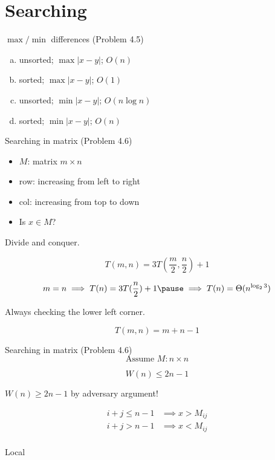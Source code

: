 \section{Searching}

\begin{frame}{$\max/\min$ differences (Problem 4.5)}
  \begin{enumerate}[(a)]
	\item unsorted; $\max |x - y|$; $O(n)$
	\item sorted; $\max |x - y|$; $O(1)$
	\item unsorted; $\min |x - y|$; $O(n \log n)$
	\item sorted; $\min |x - y|$; $O(n)$
  \end{enumerate}
\end{frame}
\begin{frame}{Searching in matrix (Problem 4.6)}
  \begin{itemize}
	\item $M$: matrix $m \times n$
	\item row: increasing from left to right
	\item col: increasing from top to down
	\item Is $x \in M$?
  \end{itemize}

  \pause
  \centerline{Divide and conquer.}

  \pause
  \[
	T(m,n) = 3T(\frac{m}{2}, \frac{n}{2}) + 1 
  \]

  \pause
  \[
	m = n \implies T(n) = 3T(\frac{n}{2}) + 1 \pause \implies T(n) = \Theta(n^{\log_{2}3})
  \]

  \pause
  \centerline{Always checking the lower left corner.}

  \pause
  \[
	T(m, n) = m + n - 1
  \]
\end{frame}
\begin{frame}{Searching in matrix (Problem 4.6)}
  \[
	\text{Assume } M: n \times n 
  \]

  \[
	W(n) \le 2n - 1
  \]

  \pause
  \vspace{0.30cm}
  \centerline{$W(n) \ge 2n - 1$ by adversary argument!}

  \pause
  \begin{align*}
	i + j \le n - 1 &\implies x > M_{ij} \\
	i + j > n - 1 &\implies x < M_{ij} \\
  \end{align*}
\end{frame}
\begin{frame}{Local }
\end{frame}
